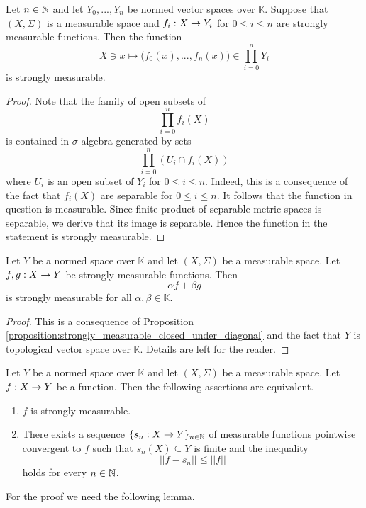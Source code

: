 \begin{proposition}\label{proposition:strongly_measurable_closed_under_diagonal}
Let $n\in {\mathbb N}$ and let $Y_0, ...,Y_n$ be normed vector spaces over $\mathbb{K}$. Suppose that $(X,\Sigma)$ is a measurable space and $f_i:X\rightarrow Y_i$ for $0 \leq i \leq n$ are strongly measurable functions. Then the function 
$$X\ni x \mapsto \bigg(f_0(x),...,f_n(x)\bigg) \in \prod_{i=0}^nY_i$$
is strongly measurable.
\end{proposition}
\begin{proof}
Note that the family of open subsets of 
$$\prod_{i=0}^nf_i(X)$$
is contained in $\sigma$-algebra generated by sets 
$$\prod_{i=0}^n\left(U_i\cap f_i(X)\right)$$
where $U_i$ is an open subset of $Y_i$ for $0\leq i \leq n$. Indeed, this is a consequence of the fact that $f_i(X)$ are separable for $0\leq i\leq n$. It follows that the function in question is measurable. Since finite product of separable metric spaces is separable, we derive that its image is separable. Hence the function in the statement is strongly measurable.
\end{proof}

\begin{corollary}\label{corollary:strongly_measurable_form_vector_space}
Let $Y$ be a normed space over $\mathbb{K}$ and let $(X,\Sigma)$ be a measurable space. Let $f, g:X\rightarrow Y$ be strongly measurable functions. Then 
$$\alpha f + \beta g$$
is strongly measurable for all $\alpha,\beta \in \mathbb{K}$.
\end{corollary}
\begin{proof}
This is a consequence of Proposition \ref{proposition:strongly_measurable_closed_under_diagonal} and the fact that $Y$ is topological vector space over $\mathbb{K}$. Details are left for the reader.
\end{proof}

\begin{theorem}\label{theorem:simple_approximation_strongly_measurable}
Let $Y$ be a normed space over $\mathbb{K}$ and let $(X,\Sigma)$ be a measurable space. Let $f:X\rightarrow Y$ be a function. Then the following assertions are equivalent.
\begin{enumerate}[label=\emph{\textbf{(\roman*)}}, leftmargin=*]
\item $f$ is strongly measurable.
\item There exists a sequence $\{s_n:X\rightarrow Y\}_{n\in {\mathbb N}}$ of measurable functions pointwise convergent to $f$ such that $s_n(X)\subseteq Y$ is finite and the inequality
$$||f - s_n||\leq ||f||$$
holds for every $n\in {\mathbb N}$.
\end{enumerate}
\end{theorem}
\noindent
For the proof we need the following lemma.

